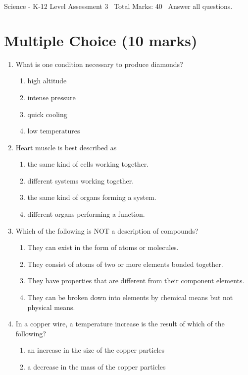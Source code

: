 \documentclass[12pt]{article}
\begin{document}
\begin{center}
Science - K-12 Level Assessment 3 \
Total Marks: 40 \
Answer all questions.
\end{center}

\section*{Multiple Choice (10 marks)}
\begin{enumerate}[label=\arabic*.]
\item What is one condition necessary to produce diamonds?
\begin{enumerate}[label=(\alph*)]
    \item high altitude
    \item intense pressure
    \item quick cooling
    \item low temperatures
\end{enumerate}
\item Heart muscle is best described as
\begin{enumerate}[label=(\alph*)]
    \item the same kind of cells working together.
    \item different systems working together.
    \item the same kind of organs forming a system.
    \item different organs performing a function.
\end{enumerate}
\item Which of the following is NOT a description of compounds?
\begin{enumerate}[label=(\alph*)]
    \item They can exist in the form of atoms or molecules.
    \item They consist of atoms of two or more elements bonded together.
    \item They have properties that are different from their component elements.
    \item They can be broken down into elements by chemical means but not physical means.
\end{enumerate}
\item In a copper wire, a temperature increase is the result of which of the following?
\begin{enumerate}[label=(\alph*)]
    \item an increase in the size of the copper particles
    \item a decrease in the mass of the copper particles

\end{enumerate}
\end{enumerate}
\end{document}
